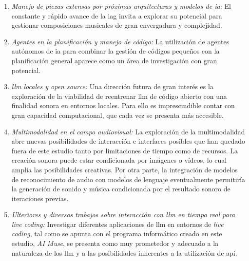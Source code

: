 \begin{enumerate}
\item \textit{Manejo de piezas extensas por próximas arquitecturas y modelos de \gls{ia}:} El constante y rápido avance de la \gls{iag} invita a explorar su potencial para gestionar composiciones musicales de gran envergadura y complejidad.

\item \textit{Agentes en la planificación y manejo de código:} La utilización de agentes autónomos de \gls{ia} para combinar la gestión de códigos pequeños con la planificación general aparece como un área de investigación con gran potencial.

\item \textit{\gls{llm} locales y open source:} Una dirección futura de gran interés es la exploración de la viabilidad de reentrenar \gls{llm} de código abierto con una finalidad sonora en entornos locales. Para ello es imprescindible contar con gran capacidad computacional, que cada vez se presenta más accesible.

\item \textit{Multimodalidad en el campo audiovisual:} La exploración de la multimodalidad abre nuevas posibilidades de interacción e interfaces posibles que han quedado fuera de este estudio tanto por limitaciones de tiempo como de recursos. La creación sonora puede estar condicionada por imágenes o vídeos, lo cual amplía las posibilidades creativas. Por otra parte, la integración de modelos de reconocimiento de audio con modelos de lenguaje eventualmente permitiría la generación de sonido y música condicionada por el resultado sonoro de iteraciones previas.

\item \textit{Ulteriores y diversos trabajos sobre interacción con \gls{llm} en tiempo real para \emph{live coding}:} Investigar diferentes aplicaciones de \gls{llm} en entornos de \emph{live coding}, tal como se apunta con el programa informático creado en este estudio, \emph{AI Muse}, se presenta como muy prometedor y adecuado a la naturaleza de los \gls{llm} y a las posibilidades inherentes a la utilización de \gls{api}.

\end{enumerate}
